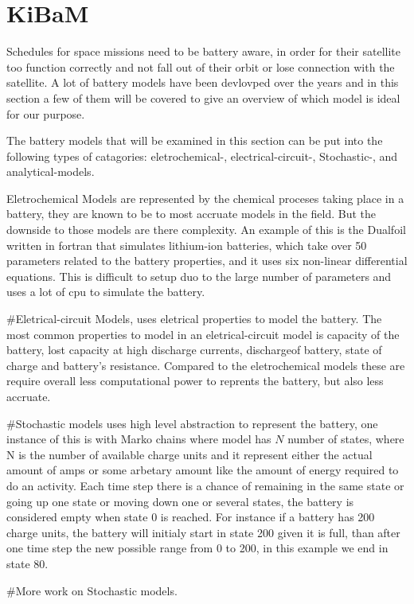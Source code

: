 \section{KiBaM}\label{sec:kibam}
Schedules for space missions need to be battery aware, in order for their satellite too function correctly and not fall out of their orbit or lose connection with the satellite. A lot of battery models have been devlovped over the years and in this section a few of them will be covered to give an overview of which model is ideal for our purpose.

The battery models that will be examined in this section can be put into the following types of catagories: eletrochemical-, electrical-circuit-, Stochastic-, and analytical-models.

Eletrochemical Models are represented by the chemical proceses taking place in a battery, they are known to be to most accruate models in the field. But the downside to those models are there complexity. An example of this is the Dualfoil written in fortran that simulates lithium-ion batteries, which take over 50 parameters related to the battery properties, and it uses six non-linear differential equations. This is difficult to setup duo to the large number of parameters and uses a lot of cpu to simulate the battery.

#Eletrical-circuit Models, uses eletrical properties to model the battery. The most common properties to model in an eletrical-circuit model is capacity of the battery, lost capacity at high discharge currents, dischargeof battery, state of charge and battery's resistance. Compared to the eletrochemical models these are require overall less computational power to reprents the battery, but also less accruate.

#Stochastic models uses high level abstraction to represent the battery, one instance of this is with Marko chains where model has $N$ number of states, where N is the number of available charge units and it represent either the actual amount of amps or some arbetary amount like the amount of energy required to do an activity. Each time step there is a chance of remaining in the same state or going up one state or moving down one or several states, the battery is considered empty when state 0 is reached. For instance if a battery has 200 charge units, the battery will initialy start in state 200 given it is full, than after one time step the new possible range from 0 to 200, in this example we end in state 80.

#More work on Stochastic models.




